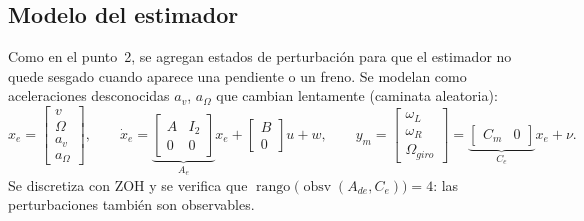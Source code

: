 \documentclass[11pt,letterpaper]{article}
\begin{document}
\subsection{Modelo del estimador}
Como en el punto~2, se agregan estados de perturbación para que el estimador no quede sesgado cuando aparece una pendiente o un freno. Se modelan como aceleraciones desconocidas $a_v$, $a_\Omega$ que cambian lentamente (caminata aleatoria):
\begin{equation}
  x_e = \begin{bmatrix} v \\ \Omega \\ a_v \\ a_\Omega \end{bmatrix},\qquad
  \dot x_e = \underbrace{\begin{bmatrix} A & I_2 \\ 0 & 0 \end{bmatrix}}_{A_e} x_e + \begin{bmatrix} B \\ 0 \end{bmatrix} u + w,\qquad
  y_m = \begin{bmatrix} \omega_L \\ \omega_R \\ \Omega_{giro} \end{bmatrix} = \underbrace{\begin{bmatrix} C_m & 0 \end{bmatrix}}_{C_e} x_e + \nu .
\end{equation}
Se discretiza con ZOH y se verifica que $\operatorname{rango}\big(\operatorname{obsv}(A_{de},C_e)\big) = 4$: las perturbaciones también son observables.
\end{document}
